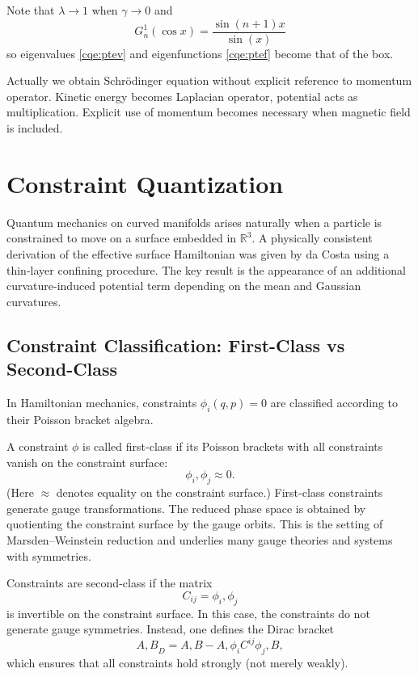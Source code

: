 Note that $\lambda \to 1$ when $ \gamma \to 0 $ and \[ 
G^1_n(\cos x)=\frac{\sin(n+1)x}{\sin(x)}\] so eigenvalues \eqref{cqe:ptev}
and eigenfunctions \eqref{cqe:ptef} become that of the box.

\begin{remark}
    Actually we obtain Schr\"odinger equation without explicit reference to momentum 
    operator. Kinetic energy becomes Laplacian operator, potential acts as multiplication.
    Explicit use of momentum becomes necessary when magnetic field is included.
\end{remark}

\section{Constraint Quantization}
\label{cqe:cq}

Quantum mechanics on curved manifolds arises naturally when a particle
is constrained to move on a surface embedded in $\mathbb{R}^3$.
A physically consistent derivation of the effective surface Hamiltonian 
was given by da Costa using a thin-layer confining procedure. The key 
result is the appearance of an additional curvature-induced potential 
term depending on the mean and Gaussian curvatures.

\subsection{Constraint Classification: First-Class vs Second-Class}
In Hamiltonian mechanics, constraints $\phi_i(q,p)=0$ are classified 
according to their Poisson bracket algebra.

A constraint $\phi$ is called first-class if its Poisson brackets with 
all constraints vanish on the constraint surface:
\begin{equation}
{\phi_i,\phi_j} \approx 0.
\end{equation}
(Here $\approx$ denotes equality on the constraint surface.)
First-class constraints generate gauge transformations. The reduced phase 
space is obtained by quotienting the constraint surface by the gauge orbits.
This is the setting of Marsden--Weinstein reduction and underlies many 
gauge theories and systems with symmetries.

Constraints are second-class if the matrix
\begin{equation}
C_{ij} = {\phi_i,\phi_j}
\end{equation}
is invertible on the constraint surface. In this case, the constraints do 
not generate gauge symmetries. Instead, one defines the Dirac bracket
\begin{equation}
{A,B}_D = {A,B} - {A,\phi_i}C^{ij}{\phi_j,B},
\end{equation}
which ensures that all constraints hold strongly (not merely weakly).

